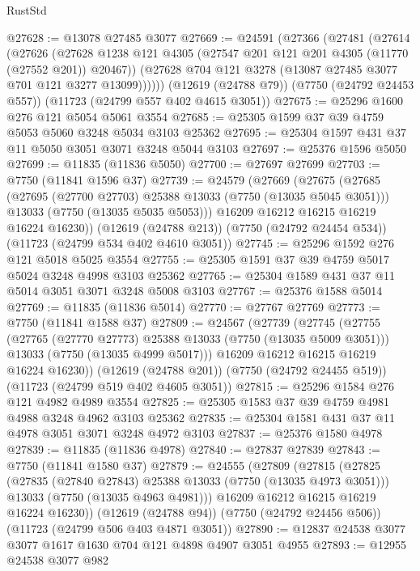 \begin{lexlean}{RustStd}
\begin{coremodule}
@27628 := @13078 @27485 @3077
@27669 := @24591
    (@27366
      (@27481
        (@27614
          (@27626
            (@27628 @1238 @121 @4305 (@27547 @201 @121 @201 @4305 (@11770 (@27552 @201)) @20467))
            (@27628 @704 @121 @3278 (@13087 @27485 @3077 @701 @121 @3277 @13099))))))
    (@12619 (@24788 @79))
    (@7750 (@24792 @24453 @557))
    (@11723 (@24799 @557 @402 @4615 @3051))
@27675 := @25296 @1600 @276 @121 @5054 @5061 @3554
@27685 := @25305 @1599 @37 @39 @4759 @5053 @5060 @3248 @5034 @3103 @25362
@27695 := @25304 @1597 @431 @37 @11 @5050 @3051 @3071 @3248 @5044 @3103
@27697 := @25376 @1596 @5050
@27699 := @11835 (@11836 @5050)
@27700 := @27697 @27699
@27703 := @7750 (@11841 @1596 @37)
@27739 := @24579
    (@27669
      (@27675
        (@27685
          (@27695 (@27700 @27703) @25388 @13033 (@7750 (@13035 @5045 @3051)))
          @13033
          (@7750 (@13035 @5035 @5053)))
        @16209
        @16212
        @16215
        @16219
        @16224
        @16230))
    (@12619 (@24788 @213))
    (@7750 (@24792 @24454 @534))
    (@11723 (@24799 @534 @402 @4610 @3051))
@27745 := @25296 @1592 @276 @121 @5018 @5025 @3554
@27755 := @25305 @1591 @37 @39 @4759 @5017 @5024 @3248 @4998 @3103 @25362
@27765 := @25304 @1589 @431 @37 @11 @5014 @3051 @3071 @3248 @5008 @3103
@27767 := @25376 @1588 @5014
@27769 := @11835 (@11836 @5014)
@27770 := @27767 @27769
@27773 := @7750 (@11841 @1588 @37)
@27809 := @24567
    (@27739
      (@27745
        (@27755
          (@27765 (@27770 @27773) @25388 @13033 (@7750 (@13035 @5009 @3051)))
          @13033
          (@7750 (@13035 @4999 @5017)))
        @16209
        @16212
        @16215
        @16219
        @16224
        @16230))
    (@12619 (@24788 @201))
    (@7750 (@24792 @24455 @519))
    (@11723 (@24799 @519 @402 @4605 @3051))
@27815 := @25296 @1584 @276 @121 @4982 @4989 @3554
@27825 := @25305 @1583 @37 @39 @4759 @4981 @4988 @3248 @4962 @3103 @25362
@27835 := @25304 @1581 @431 @37 @11 @4978 @3051 @3071 @3248 @4972 @3103
@27837 := @25376 @1580 @4978
@27839 := @11835 (@11836 @4978)
@27840 := @27837 @27839
@27843 := @7750 (@11841 @1580 @37)
@27879 := @24555
    (@27809
      (@27815
        (@27825
          (@27835 (@27840 @27843) @25388 @13033 (@7750 (@13035 @4973 @3051)))
          @13033
          (@7750 (@13035 @4963 @4981)))
        @16209
        @16212
        @16215
        @16219
        @16224
        @16230))
    (@12619 (@24788 @94))
    (@7750 (@24792 @24456 @506))
    (@11723 (@24799 @506 @403 @4871 @3051))
@27890 := @12837 @24538 @3077 @3077 @1617 @1630 @704 @121 @4898 @4907 @3051 @4955
@27893 := @12955 @24538 @3077 @982

\end{coremodule}
\end{lexlean}
